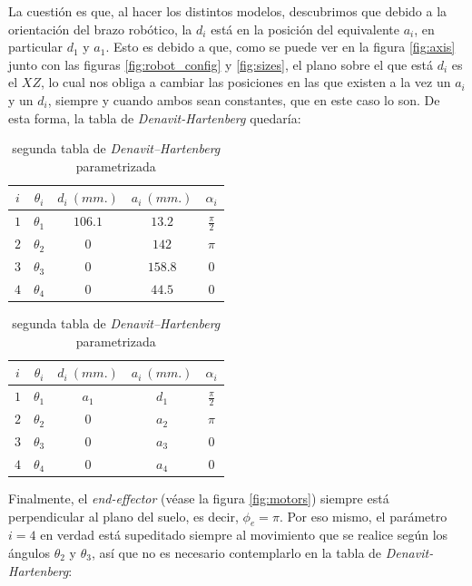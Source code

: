 \documentclass[a4paper,12pt]{article}
\begin{document}
La cuestión es que, al hacer los distintos modelos, descubrimos que debido a la orientación del brazo
robótico, la $d_i$ está en la posición del equivalente $a_i$, en particular $d_1$ y $a_1$.
Esto es debido a que, como se puede ver en la figura \ref{fig:axis} junto con las figuras \ref{fig:robot_config}
y \ref{fig:sizes}, el plano sobre el que está $d_i$ es el $XZ$, lo cual nos obliga a cambiar las posiciones
en las que existen a la vez un $a_i$ y un $d_i$, siempre y cuando ambos sean constantes, que en este caso lo son.
De esta forma, la tabla de \textit{Denavit-Hartenberg} quedaría:

\begin{table}[H]
    \parbox{.45\linewidth}{
        \centering
        \begin{tabular}{ c | c c c c }
            $i$ & $\theta_i$ & $d_i~(mm.)$ & $a_i~(mm.)$ & $\alpha_i$      \\ [0.5ex]
            \hline
            $1$ & $\theta_1$ & $106.1$     & $13.2$      & $\frac{\pi}{2}$ \\
            $2$ & $\theta_2$ & $0$         & $142$       & $\pi$           \\
            $3$ & $\theta_3$ & $0$         & $158.8$     & $0$             \\
            $4$ & $\theta_4$ & $0$         & $44.5$      & $0$             \\ [1ex]
        \end{tabular}
        \caption{segunda tabla de \textit{Denavit–Hartenberg}}
    }
    \hfill
    \parbox{.45\linewidth}{
        \centering
        \begin{tabular}{ c | c c c c }
            $i$ & $\theta_i$ & $d_i~(mm.)$ & $a_i~(mm.)$ & $\alpha_i$      \\ [0.5ex]
            \hline
            $1$ & $\theta_1$ & $a_1$       & $d_1$       & $\frac{\pi}{2}$ \\
            $2$ & $\theta_2$ & $0$         & $a_2$       & $\pi$           \\
            $3$ & $\theta_3$ & $0$         & $a_3$       & $0$             \\
            $4$ & $\theta_4$ & $0$         & $a_4$       & $0$             \\ [1ex]
        \end{tabular}
        \caption{segunda tabla de \textit{Denavit–Hartenberg} parametrizada}
    }
\end{table}

Finalmente, el \textit{end-effector} (véase la figura \ref{fig:motors}) siempre está perpendicular
al plano del suelo, es decir, $\phi_e = \pi$. Por eso mismo, el parámetro $i = 4$ en verdad
está supeditado siempre al movimiento que se realice según los ángulos $\theta_2$ y $\theta_3$, así
que no es necesario contemplarlo en la tabla de \textit{Denavit-Hartenberg}:
\end{document}
